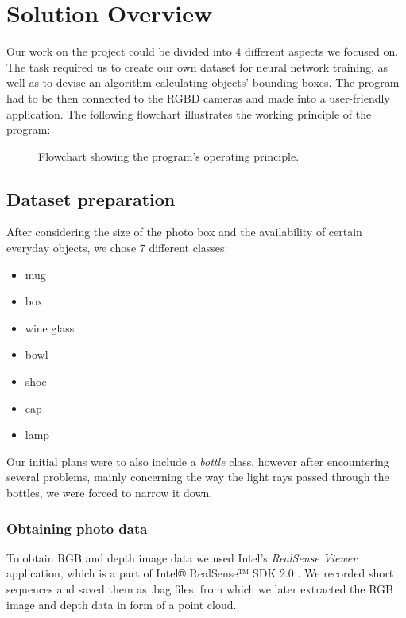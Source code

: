 \chapter{Solution Overview}
Our work on the project could be divided into 4 different aspects we focused on. The task required us to create our own dataset for neural network training, as well as to devise an algorithm calculating objects' bounding boxes. The program had to be then connected to the RGBD cameras and made into a user-friendly application. The following flowchart illustrates the working principle of the program:

\begin{figure}[ht]
    \centering
    
    \caption{Flowchart showing the program's operating principle.}
    \label{fig:app-flowchart}
\end{figure}

\section{Dataset preparation}
After considering the size of the photo box and the availability of certain everyday objects, we chose 7 different classes:
\begin{itemize}[noitemsep,topsep=0pt,parsep=0pt,partopsep=0pt]
    \item mug
    \item box
    \item wine glass
    \item bowl
    \item shoe
    \item cap
    \item lamp
\end{itemize}
Our initial plans were to also include a \textit{bottle} class, however after encountering several problems, mainly concerning the way the light rays passed through the bottles, we were forced to narrow it down.

\subsection{Obtaining photo data}
To obtain RGB and depth image data we used Intel's \textit{RealSense Viewer} application, which is a part of Intel® RealSense™ SDK 2.0 \cite{realsense-sdk}. We recorded short sequences and saved them as .bag files, from which we later extracted the RGB image and depth data in form of a point cloud.

